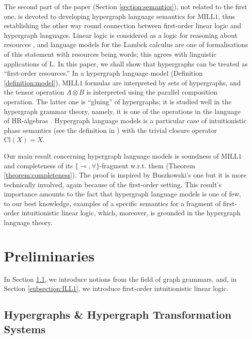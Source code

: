 \documentclass[a4paper,UKenglish,cleveref, autoref, thm-restate,pdfa]{lipics-v2021}
\newcommand{\mconj}{\otimes}
\newcommand{\limpl}{\multimap}
\newcommand{\MILLFO}{\mathrm{MILL}1}
\begin{document}
The second part of the paper (Section \ref{section:semantics}), not related to the first one, is devoted to developing hypergraph language semantics for $\MILLFO$, thus establishing the other way round connection between first-order linear logic and hypergraph languages. Linear logic is considered as a logic for reasoning about resources \cite{Girard93}, and language models for the Lambek calculus are one of formalisations of this statement with resources being words; this agrees with linguistic applications of $\mathrm{L}$. In this paper, we shall show that hypergraphs can be treated as ``first-order resources.'' In a hypergraph language model (Definition \ref{definition:model}), $\MILLFO$ formulas are interpreted by sets of hypergraphs, and the tensor operation $A \mconj B$ is interpreted using the parallel composition operation. The latter one is ``gluing'' of hypergraphs; it is studied well in the hypergraph grammar theory, namely, it is one of the operations in the language of HR-algebras \cite{CourcelleE12}. Hypergraph language models is a particular case of intuitionistic phase semantics (see the definition in \cite{KanovichOT06}) with the trivial closure operator $\mathrm{Cl}(X)=X$.

Our main result concerning hypergraph language models is soundness of $\MILLFO$ and completeness of its $\{\limpl,\forall\}$-fragment w.r.t. them (Theorem \ref{theorem:completeness}). The proof is inspired by Buszkowski's one \cite{Buszkowski82} but it is more technically involved, again because of the first-order setting. This result's importance amounts to the fact that hypergraph language models is one of few, to our best knowledge, examples of a specific semantics for a fragment of first-order intuitionistic linear logic, which, moreover, is grounded in the hypergraph language theory.



\section{Preliminaries}\label{section:preliminaries}

In Section \ref{subsection:hypergraphs}, we introduce notions from the field of graph grammars, and, in Section \ref{subsection:ILL1}, we introduce first-order intuitionistic linear logic. 

\subsection{Hypergraphs \& Hypergraph Transformation Systems}\label{subsection:hypergraphs}
\end{document}
